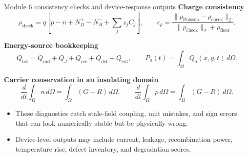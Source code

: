 \documentclass[aspectratio=169,10pt]{beamer}
\begin{document}
\begin{frame}{Module 6 consistency checks and device-response outputs}
\footnotesize
\textbf{Charge consistency}
\vspace{-0.25em}
\begin{equation*}
\rho_{\mathrm{check}}
=q\left[p-n+N_D^+-N_A^-+\sum_j z_jC_j\right],
\qquad
\epsilon_\rho=
\frac{\|\rho_{\mathrm{Poisson}}-\rho_{\mathrm{check}}\|_2}
{\|\rho_{\mathrm{check}}\|_2+\rho_{\mathrm{floor}}}.
\end{equation*}

\vspace{-0.35em}
\textbf{Energy-source bookkeeping}
\vspace{-0.25em}
\begin{equation*}
Q_{\mathrm{tot}}=Q_{\mathrm{rad}}+Q_J+Q_{\mathrm{rec}}+Q_{\mathrm{def}}+Q_{\mathrm{ext}},
\qquad
P_a(t)=\int_\Omega Q_a(x,y,t)\,d\Omega.
\end{equation*}

\vspace{-0.35em}
\textbf{Carrier conservation in an insulating domain}
\vspace{-0.25em}
\begin{equation*}
\frac{d}{dt}\int_\Omega n\,d\Omega=\int_\Omega(G-R)\,d\Omega,
\qquad
\frac{d}{dt}\int_\Omega p\,d\Omega=\int_\Omega(G-R)\,d\Omega.
\end{equation*}

\vspace{-0.25em}
\begin{itemize}
    \item These diagnostics catch stale-field coupling, unit mistakes, and sign errors that can look numerically stable but be physically wrong.
    \item Device-level outputs may include current, leakage, recombination power, temperature rise, defect inventory, and degradation scores.
\end{itemize}
\end{frame}
\end{document}

